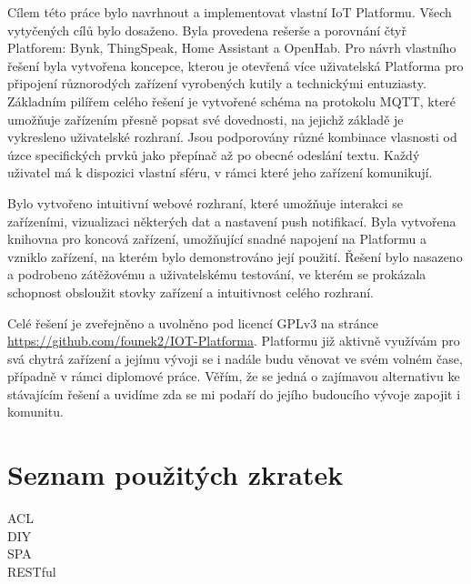 \documentclass[thesis=B,czech]{FITthesis}[2019/12/23]
\begin{document}
\begin{conclusion}
    Cílem této práce bylo navrhnout a implementovat vlastní IoT Platformu. Všech vytyčených cílů bylo dosaženo. Byla provedena rešerše a porovnání čtyř Platforem: Bynk, ThingSpeak, Home Assistant a OpenHab. Pro návrh vlastního řešení byla vytvořena koncepce, kterou je otevřená více uživatelská Platforma pro připojení různorodých zařízení vyrobených kutily a technickými entuziasty. Základním pilířem celého řešení je vytvořené schéma na protokolu MQTT, které umožňuje zařízením přesně popsat své dovednosti, na jejichž základě je vykresleno uživatelské rozhraní. Jsou podporovány různé kombinace vlasnosti od úzce specifických prvků jako přepínač až po obecné odeslání textu. Každý uživatel má k dispozici vlastní sféru, v rámci které jeho zařízení komunikují.

    Bylo vytvořeno intuitivní webové rozhraní, které umožňuje interakci se zařízeními, vizualizaci některých dat a nastavení push notifikací. Byla vytvořena knihovna pro koncová zařízení, umožňující snadné napojení na Platformu a vzniklo zařízení, na kterém bylo demonstrováno její použití. Řešení bylo nasazeno a podrobeno zátěžovému a uživatelskému testování, ve kterém se prokázala schopnost obsloužit stovky zařízení a intuitivnost celého rozhraní.

    Celé řešení je zveřejněno a uvolněno pod licencí GPLv3 na stránce \url{https://github.com/founek2/IOT-Platforma}. Platformu již aktivně využívám pro svá chytrá zařízení a jejímu vývoji se i nadále budu věnovat ve svém volném čase, případně v rámci diplomové práce. Věřím, že se jedná o zajímavou alternativu ke stávajícím řešení a uvidíme zda se mi podaří do jejího budoucího vývoje zapojit i komunitu.
\end{conclusion}




\appendix

\chapter{Seznam použitých zkratek}
\begin{description}
    \item[ACL]
    \item[DIY]
    \item[SPA]
    \item[RESTful]
\end{description}
\end{document}
